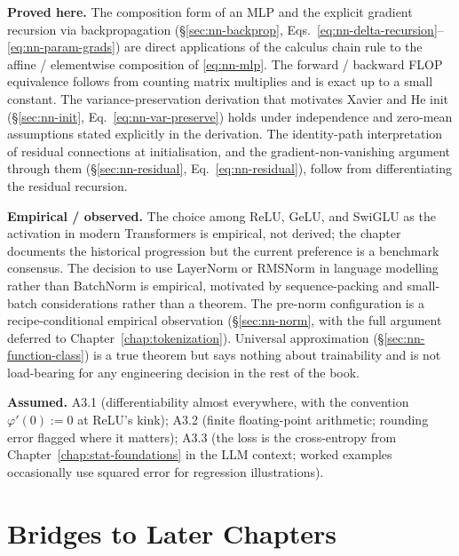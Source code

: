 
\begin{provedassumed}
\textbf{Proved here.}
The composition form of an MLP and the explicit gradient
recursion via backpropagation
(\S\ref{sec:nn-backprop},
Eqs.~\ref{eq:nn-delta-recursion}--\ref{eq:nn-param-grads}) are
direct applications of the calculus chain rule to the affine /
elementwise composition of \eqref{eq:nn-mlp}. The
forward / backward FLOP equivalence follows from counting matrix
multiplies and is exact up to a small constant. The
variance-preservation derivation that motivates Xavier and He
init (\S\ref{sec:nn-init}, Eq.~\ref{eq:nn-var-preserve}) holds
under independence and zero-mean assumptions stated explicitly
in the derivation. The identity-path interpretation of residual
connections at initialisation, and the gradient-non-vanishing
argument through them
(\S\ref{sec:nn-residual}, Eq.~\ref{eq:nn-residual}), follow
from differentiating the residual recursion.

\textbf{Empirical / observed.}
The choice among ReLU, GeLU, and SwiGLU as the activation in
modern Transformers is empirical, not derived; the chapter
documents the historical progression but the current preference
is a benchmark consensus. The decision to use LayerNorm or
RMSNorm in language modelling rather than BatchNorm is
empirical, motivated by sequence-packing and small-batch
considerations rather than a theorem. The pre-norm
configuration is a recipe-conditional empirical observation
(\S\ref{sec:nn-norm}, with the full argument deferred to
Chapter~\ref{chap:tokenization}). Universal approximation
(\S\ref{sec:nn-function-class}) is a true theorem but says
nothing about trainability and is not load-bearing for any
engineering decision in the rest of the book.

\textbf{Assumed.}
A3.1 (differentiability almost everywhere, with the convention
$\varphi'(0) := 0$ at ReLU's kink); A3.2 (finite floating-point
arithmetic; rounding error flagged where it matters); A3.3 (the
loss is the cross-entropy from Chapter~\ref{chap:stat-foundations} in the LLM context;
worked examples occasionally use squared error for regression
illustrations).
\end{provedassumed}

\section{Bridges to Later Chapters}

